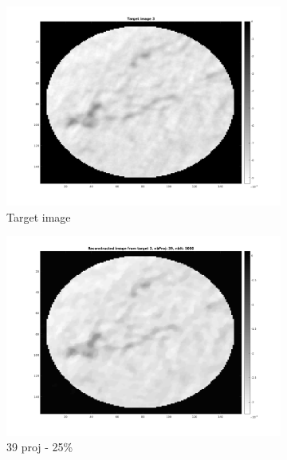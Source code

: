 \documentclass[10pt,a4paper,titlepage]{article}
\begin{document}
\begin{figure}[H]
        	
        	\begin{subfigure}[b]{0.32\textwidth}   
        	    \centering 
            	\includegraphics[width=\textwidth]{Sample3/target3.png}
            	\caption{Target image}
        	\end{subfigure}
        	\begin{subfigure}[b]{0.32\textwidth}   
        	    \centering 
        	    \includegraphics[width=\textwidth]{Sample3/L-D_5000/39_1_4.png}
        	    \caption{39 proj - 25\%}    
        	    \label{subfig:39p3L-D}
       		\end{subfigure}
        	\begin{subfigure}[b]{0.32\textwidth}  

\end{subfigure}
\end{figure}
\end{document}
